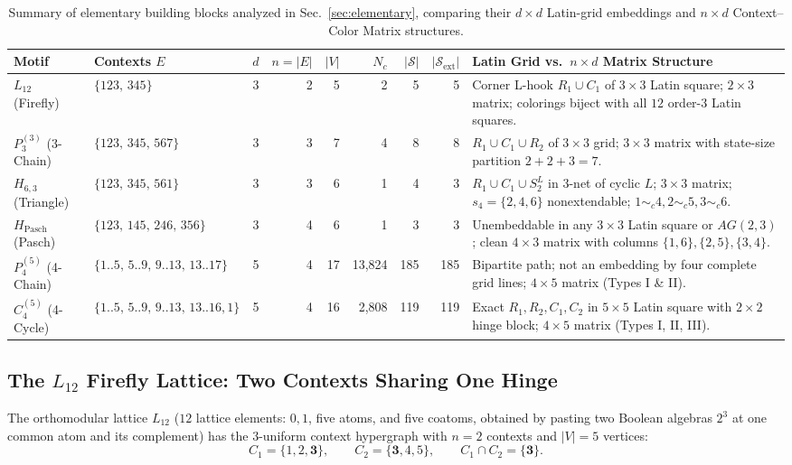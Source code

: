\documentclass[aps,pra,reprint,superscriptaddress,longbibliography,nofootinbib,floatfix,10pt]{revtex4-2}
\theoremstyle{definition}\newtheorem{definition}[theorem]{Definition}
\theoremstyle{remark}\newtheorem{remark}[theorem]{Remark}
\newcommand{\Sc}{\mathcal S}\newcommand{\Cc}{\mathcal C}
\begin{document}
\begin{table}[t]
\centering\footnotesize\setlength{\tabcolsep}{3.5pt}
\caption{Summary of elementary building blocks analyzed in Sec.~\ref{sec:elementary}, comparing their $d\times d$ Latin-grid embeddings and $n\times d$ Context--Color Matrix structures.}\label{tab:elementary-summary}
\begin{tabular}{llrrrrrrp{}}\toprule
Motif & Contexts $E$ & $d$ & $n=|E|$ & $|V|$ & $N_c$ & $|\Sc|$ & $|\Sc_{\mathrm{ext}}|$ & Latin Grid vs.\ $n\times d$ Matrix Structure\\\midrule
$L_{12}$ (Firefly) & $\{123,\,345\}$ & 3 & 2 & 5 & 2 & 5 & 5 & Corner L-hook $R_1\cup C_1$ of $3\times 3$ Latin square; $2\times 3$ matrix; colorings biject with all $12$ order-$3$ Latin squares.\\
$P_3^{(3)}$ (3-Chain) & $\{123,\,345,\,567\}$ & 3 & 3 & 7 & 4 & 8 & 8 & $R_1\cup C_1\cup R_2$ of $3\times 3$ grid; $3\times 3$ matrix with state-size partition $2+2+3=7$.\\
$H_{6,3}$ (Triangle) & $\{123,\,345,\,561\}$ & 3 & 3 & 6 & 1 & 4 & 3 & $R_1\cup C_1\cup S_2^L$ in $3$-net of cyclic $L$; $3\times 3$ matrix; $s_4=\{2,4,6\}$ nonextendable; $1\sim_c 4,2\sim_c 5,3\sim_c 6$.\\
$H_{\mathrm{Pasch}}$ (Pasch) & $\{123,\,145,\,246,\,356\}$ & 3 & 4 & 6 & 1 & 3 & 3 & Unembeddable in any $3\times 3$ Latin square or $AG(2,3)$; clean $4\times 3$ matrix with columns $\{1,6\},\{2,5\},\{3,4\}$.\\
$P_4^{(5)}$ (4-Chain) & $\{1..5,\,5..9,\,9..13,\,13..17\}$ & 5 & 4 & 17 & 13,824 & 185 & 185 & Bipartite path; not an embedding by four complete grid lines; $4\times 5$ matrix (Types I \& II).\\
$C_4^{(5)}$ (4-Cycle) & $\{1..5,\,5..9,\,9..13,\,13..16,1\}$ & 5 & 4 & 16 & 2,808 & 119 & 119 & Exact $R_1,R_2,C_1,C_2$ in $5\times 5$ Latin square with $2\times 2$ hinge block; $4\times 5$ matrix (Types I, II, III).\\
\bottomrule\end{tabular}
\end{table}

\subsection{The \texorpdfstring{$L_{12}$}{L12} Firefly Lattice: Two Contexts Sharing One Hinge}\label{sec:L12}

The orthomodular lattice $L_{12}$ ($12$ lattice elements: $0,1$, five atoms, and five coatoms, obtained by pasting two Boolean algebras $2^3$ at one common atom and its complement) has the $3$-uniform context hypergraph with $n=2$ contexts and $|V|=5$ vertices:
\begin{equation}\label{eq:L12}
C_1=\{1,2,\mathbf{3}\},\qquad C_2=\{\mathbf{3},4,5\},\qquad C_1\cap C_2=\{\mathbf{3}\}.
\end{equation}
\end{document}
